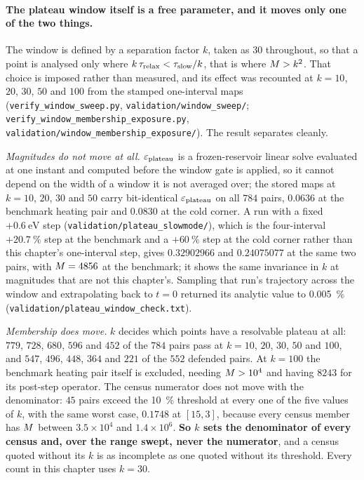 \paragraph{The plateau window itself is a free parameter, and it moves only one
of the two things.} The window is defined by a separation factor $k$, taken as
$30$ throughout, so that a point is analysed only where
$k\,\tau_{\mathrm{relax}} < \tau_{\mathrm{slow}}/k$, that is where $M > k^{2}$. That choice is
imposed rather than measured, and its effect was recounted at $k = 10$, $20$,
$30$, $50$ and $100$ from the stamped one-interval maps
(\texttt{verify\_window\_sweep.py}, \texttt{validation/window\_sweep/};
\texttt{verify\_window\_membership\_exposure.py},
\texttt{validation/window\_membership\_exposure/}). The result separates
cleanly.

\emph{Magnitudes do not move at all.} $\varepsilon_{\mathrm{plateau}}$ is a frozen-reservoir linear
solve evaluated at one instant and computed before the window gate is applied,
so it cannot depend on the width of a window it is not averaged over; the
stored maps at $k = 10$, $20$, $30$ and $50$ carry bit-identical $\varepsilon_{\mathrm{plateau}}$ on
all $784$ pairs, $0.0636$ at the benchmark heating pair and $0.0830$ at the
cold corner. A run with a fixed $+\SI{0.6}{\electronvolt}$ step
(\texttt{validation/plateau\_slowmode/}), which is the four-interval
$+\SI{20.7}{\percent}$ step at the benchmark and a $+\SI{60}{\percent}$ step at
the cold corner rather than this chapter's one-interval step, gives
$0.32902966$ and $0.24075077$ at the same two pairs, with $M = 4856$ at the
benchmark; it shows the same invariance in $k$ at magnitudes that are not this
chapter's. Sampling that run's trajectory across the window and
extrapolating back to $t=0$ returned its analytic value to
\SI{0.005}{\percent} (\texttt{validation/plateau\_window\_check.txt}).

\emph{Membership does move.} $k$ decides which points have a resolvable plateau
at all: $779$, $728$, $680$, $596$ and $452$ of the $784$ pairs pass at
$k = 10$, $20$, $30$, $50$ and $100$, and $547$, $496$, $448$, $364$ and $221$
of the $552$ defended pairs. At $k = 100$ the benchmark heating pair itself is
excluded, needing $M > 10^{4}$ and having $8243$ for its post-step
operator. The census numerator does not move with the denominator: $45$ pairs
exceed the \SI{10}{\percent} threshold at every one of the five values of $k$,
with the same worst case, $0.1748$ at $[15,3]$, because every census member
has $M$ between $3.5\times10^{4}$ and $1.4\times10^{6}$. \textbf{So $k$
sets the denominator of every census and, over the range swept, never the
numerator}, and a census quoted without its $k$ is as incomplete as one quoted
without its threshold. Every count in this chapter uses $k=30$.

